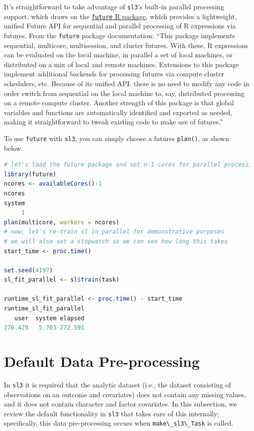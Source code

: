 \documentclass[
  12pt, krantz2,
]{krantz}
\newcommand{\passthrough}[1]{#1}
\newcommand{\1}{\mathbbm{1}}
\theoremstyle{definition}
\theoremstyle{definition}
\theoremstyle{definition}
\theoremstyle{definition}
\theoremstyle{remark}
\begin{document}
It's straightforward to take advantage of \passthrough{\lstinline!sl3!}'s built-in parallel processing
support, which draws on the \href{https://cran.r-project.org/web/packages/future/index.html}{\passthrough{\lstinline!future!} R
package}, which
provides a lightweight, unified Future API for sequential and parallel
processing of R expressions via futures. From the \passthrough{\lstinline!future!} package
documentation: ``This package implements sequential, multicore, multisession, and cluster futures. With these, R expressions can be evaluated on the local
machine, in parallel a set of local machines, or distributed on a mix of local
and remote machines. Extensions to this package implement additional backends
for processing futures via compute cluster schedulers, etc. Because of its
unified API, there is no need to modify any code in order switch from
sequential on the local machine to, say, distributed processing on a remote
compute cluster. Another strength of this package is that global variables and
functions are automatically identified and exported as needed, making it
straightforward to tweak existing code to make use of futures.''

To use \passthrough{\lstinline!future!} with \passthrough{\lstinline!sl3!}, you can simply choose a futures \passthrough{\lstinline!plan()!}, as shown
below.

\begin{lstlisting}[language=R]
# let's load the future package and set n-1 cores for parallel processing
library(future)
ncores <- availableCores()-1
ncores
system 
     1 
plan(multicore, workers = ncores)
# now, let's re-train sl in parallel for demonstrative purposes
# we will also set a stopwatch so we can see how long this takes
start_time <- proc.time()

set.seed(4197)
sl_fit_parallel <- sl$train(task)

runtime_sl_fit_parallel <- proc.time() - start_time
runtime_sl_fit_parallel
   user  system elapsed 
276.429   5.703 272.591 
\end{lstlisting}

\hypertarget{default-data-pre-processing}{%
\section{Default Data Pre-processing}\label{default-data-pre-processing}}

In \passthrough{\lstinline!sl3!} it is required that the analytic dataset (i.e., the dataset
consisting of observations on an outcome and covariates) does not contain any
missing values, and it does not contain character and factor covariates.
In this subsection, we review the default functionality in \passthrough{\lstinline!sl3!} that takes care
of this internally; specifically, this data pre-processing occurs when
\passthrough{\lstinline!make\_sl3\_Task!} is called.
\end{document}
